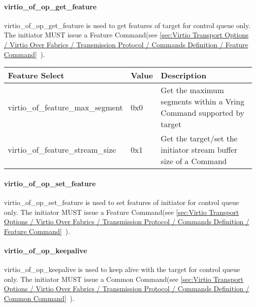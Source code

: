 \paragraph{virtio_of_op_get_feature}\label{sec:Virtio Transport Options / Virtio Over Fabrics / Transmission Protocol / Opcodes Definition / virtio_of_op_get_feature}

virtio_of_op_get_feature is used to get features of target for control queue only. The initiator MUST issue a Feature Command(see \ref{sec:Virtio Transport Options / Virtio Over Fabrics / Transmission Protocol / Commands Definition / Feature Command}~).

\begin{tabular}{ |l|l|l| }
\hline
Feature Select & Value & Description \\
\hline
virtio_of_feature_max_segment & 0x0 & Get the maximum segments within a Vring Command supported by target \\
\hline
virtio_of_feature_stream_size & 0x1 & Get the target/set the initiator stream buffer size of a Command \\
\hline
\end{tabular}

\paragraph{virtio_of_op_set_feature}\label{sec:Virtio Transport Options / Virtio Over Fabrics / Transmission Protocol / Opcodes Definition / virtio_of_op_set_feature}

virtio_of_op_set_feature is used to set features of initiator for control queue only. The initiator MUST issue a Feature Command(see \ref{sec:Virtio Transport Options / Virtio Over Fabrics / Transmission Protocol / Commands Definition / Feature Command}~).

\paragraph{virtio_of_op_keepalive}\label{sec:Virtio Transport Options / Virtio Over Fabrics / Transmission Protocol / Opcodes Definition / virtio_of_op_keepalive}

virtio_of_op_keepalive is used to keep alive with the target for control queue only. The initiator MUST issue a Common Command(see \ref{sec:Virtio Transport Options / Virtio Over Fabrics / Transmission Protocol / Commands Definition / Common Command}~).

